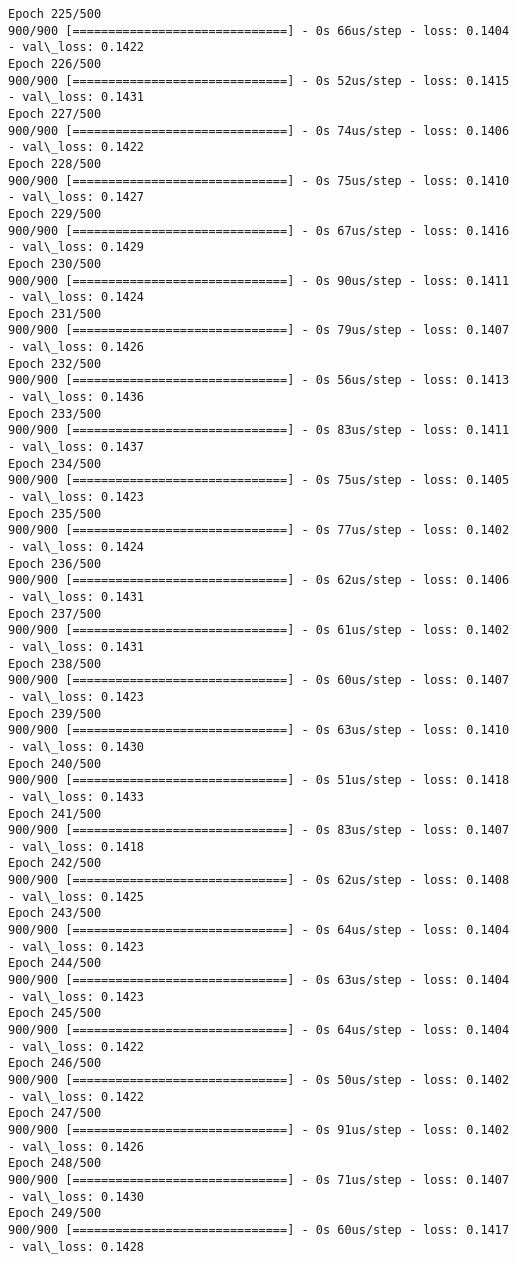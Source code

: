 \documentclass[11pt]{article}
\begin{document}
\begin{Verbatim}[commandchars=\\\{\}]
Epoch 225/500
900/900 [==============================] - 0s 66us/step - loss: 0.1404 - val\_loss: 0.1422
Epoch 226/500
900/900 [==============================] - 0s 52us/step - loss: 0.1415 - val\_loss: 0.1431
Epoch 227/500
900/900 [==============================] - 0s 74us/step - loss: 0.1406 - val\_loss: 0.1422
Epoch 228/500
900/900 [==============================] - 0s 75us/step - loss: 0.1410 - val\_loss: 0.1427
Epoch 229/500
900/900 [==============================] - 0s 67us/step - loss: 0.1416 - val\_loss: 0.1429
Epoch 230/500
900/900 [==============================] - 0s 90us/step - loss: 0.1411 - val\_loss: 0.1424
Epoch 231/500
900/900 [==============================] - 0s 79us/step - loss: 0.1407 - val\_loss: 0.1426
Epoch 232/500
900/900 [==============================] - 0s 56us/step - loss: 0.1413 - val\_loss: 0.1436
Epoch 233/500
900/900 [==============================] - 0s 83us/step - loss: 0.1411 - val\_loss: 0.1437
Epoch 234/500
900/900 [==============================] - 0s 75us/step - loss: 0.1405 - val\_loss: 0.1423
Epoch 235/500
900/900 [==============================] - 0s 77us/step - loss: 0.1402 - val\_loss: 0.1424
Epoch 236/500
900/900 [==============================] - 0s 62us/step - loss: 0.1406 - val\_loss: 0.1431
Epoch 237/500
900/900 [==============================] - 0s 61us/step - loss: 0.1402 - val\_loss: 0.1431
Epoch 238/500
900/900 [==============================] - 0s 60us/step - loss: 0.1407 - val\_loss: 0.1423
Epoch 239/500
900/900 [==============================] - 0s 63us/step - loss: 0.1410 - val\_loss: 0.1430
Epoch 240/500
900/900 [==============================] - 0s 51us/step - loss: 0.1418 - val\_loss: 0.1433
Epoch 241/500
900/900 [==============================] - 0s 83us/step - loss: 0.1407 - val\_loss: 0.1418
Epoch 242/500
900/900 [==============================] - 0s 62us/step - loss: 0.1408 - val\_loss: 0.1425
Epoch 243/500
900/900 [==============================] - 0s 64us/step - loss: 0.1404 - val\_loss: 0.1423
Epoch 244/500
900/900 [==============================] - 0s 63us/step - loss: 0.1404 - val\_loss: 0.1423
Epoch 245/500
900/900 [==============================] - 0s 64us/step - loss: 0.1404 - val\_loss: 0.1422
Epoch 246/500
900/900 [==============================] - 0s 50us/step - loss: 0.1402 - val\_loss: 0.1422
Epoch 247/500
900/900 [==============================] - 0s 91us/step - loss: 0.1402 - val\_loss: 0.1426
Epoch 248/500
900/900 [==============================] - 0s 71us/step - loss: 0.1407 - val\_loss: 0.1430
Epoch 249/500
900/900 [==============================] - 0s 60us/step - loss: 0.1417 - val\_loss: 0.1428

\end{Verbatim}
\end{document}
